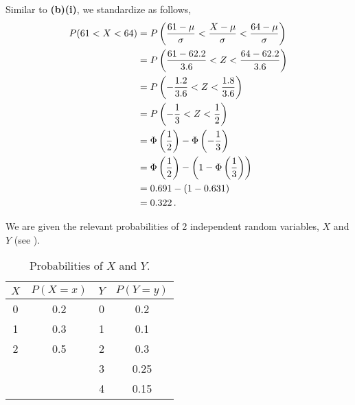 \begin{subquestions}
\begin{subsubquestions}

\subsubquestion

Similar to \textbf{(b)(i)}, we standardize as follows,
\begin{align}
	P(61<X<64) & = P\left(\frac{61- \mu}{\sigma} < \frac{X - \mu}{\sigma} < \frac{64 - \mu}{\sigma} \right) \nonumber \\
	           & = P\left(\frac{61- 62.2}{3.6} < Z < \frac{64 - 62.2}{3.6} \right) \nonumber \\
	           & = P\left(-\frac{1.2}{3.6} < Z < \frac{1.8}{3.6} \right) \nonumber \\
	           & = P\left(-\frac{1}{3} < Z < \frac{1}{2} \right) \nonumber \\
	           & = \Phi\left(\frac{1}{2} \right) - \Phi\left(-\frac{1}{3}\right) \nonumber \\
	           & = \Phi\left(\frac{1}{2} \right) - \left(1 - \Phi\left(\frac{1}{3}\right) \right) \nonumber \\
	           & = 0.691 - (1 - 0.631) \nonumber \\
	           & = 0.322 \,.
\end{align}

\end{subsubquestions}


\subquestion

We are given the relevant probabilities of 2 independent random variables, $X$ and $Y$ (see ).
\begin{table}[H]
	\centering
	\begin{tabular}{|c|c|c|c|}
		\hline
		$X$ & $P(X=x)$ & $Y$ & $P(Y=y)$ \\
		\hline
		0 & 0.2 & 0 & 0.2 \\
		1 & 0.3 & 1 & 0.1 \\
		2 & 0.5 & 2 & 0.3 \\
		  &     & 3 & 0.25 \\
		  &     & 4 & 0.15 \\
		  \hline
	\end{tabular}
	\caption{\label{2014:q4:Tab1} Probabilities of $X$ and $Y$.}
\end{table}

\begin{subsubquestions} 


\end{subsubquestions}
\end{subquestions}
